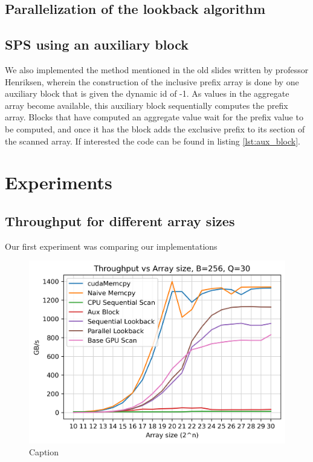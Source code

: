 \documentclass[twocolumn]{article}
\begin{document}
\subsection{Parallelization of the lookback algorithm}


\subsection{SPS using an auxiliary block}

We also implemented the method mentioned in the old slides written by professor Henriksen, wherein the construction of the inclusive prefix array is done by one auxiliary block that is given the dynamic id of -1. As values in the aggregate array become available, this auxiliary block sequentially computes the prefix array. Blocks that have computed an aggregate value wait for the prefix value to be computed, and once it has the block adds the exclusive prefix to its section of the scanned array. If interested the code can be found in listing \ref{lst:aux_block}.


\section{Experiments}
\label{sec:experiments}
\subsection{Throughput for different array sizes}
Our first experiment was comparing our implementations

\begin{figure}
    \centering
    \includegraphics[width=\linewidth]{report/plots/throughput_vs_array_size_B256_Q30.png}
    \caption{Caption}
    \label{fig:enter-label}
\end{figure}
\end{document}
